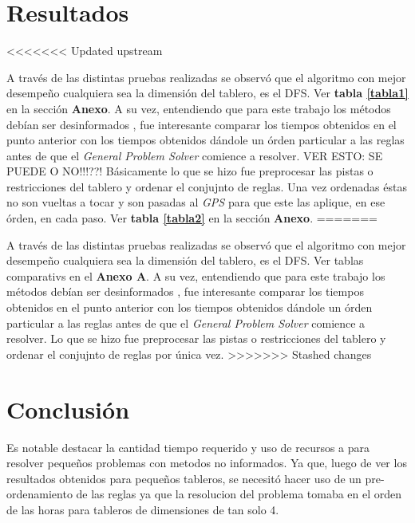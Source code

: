 \documentclass[%
	final,
	reprint,
	notitlepage,
	narroweqnarray,
	inline,
	twoside,
	invited
	]{ieee}
\begin{document}
\section{Resultados}

<<<<<<< Updated upstream
\par A través de las distintas pruebas realizadas se observó que el algoritmo con mejor desempeño cualquiera sea la dimensión del tablero, es el DFS. Ver \textbf{tabla \ref{tabla1}} en la sección \textbf{Anexo}. A su vez, entendiendo que para este trabajo los métodos debían ser desinformados , fue interesante comparar los tiempos obtenidos en el punto anterior con los tiempos obtenidos dándole un órden particular a las reglas antes de que el \textit{General Problem Solver} comience a resolver. VER ESTO: SE PUEDE O NO!!!??! Básicamente lo que se hizo fue preprocesar las pistas o restricciones del tablero y ordenar el conjujnto de reglas. Una vez ordenadas éstas no son vueltas a tocar y son pasadas al \textit{GPS} para que este las aplique, en ese órden, en cada paso. Ver \textbf{tabla \ref{tabla2}} en la sección \textbf{Anexo}.
=======
\par A través de las distintas pruebas realizadas se observó que el algoritmo con mejor desempeño cualquiera sea la dimensión del tablero, es el DFS. Ver tablas comparativs en el  \textbf{Anexo A}. A su vez, entendiendo que para este trabajo los métodos debían ser desinformados , fue interesante comparar los tiempos obtenidos en el punto anterior con los tiempos obtenidos dándole un órden particular a las reglas antes de que el \textit{General Problem Solver} comience a resolver. Lo que se hizo fue preprocesar las pistas o restricciones del tablero y ordenar el conjujnto de reglas por única vez. 
>>>>>>> Stashed changes

\section{Conclusión}

\PARstart Es notable destacar la cantidad tiempo requerido y uso de recursos a para resolver pequeños problemas con metodos no informados. Ya que, luego de ver los resultados obtenidos para pequeños tableros, se necesitó hacer uso de un pre-ordenamiento de las reglas ya que la resolucion del problema tomaba en el orden de las horas para tableros de dimensiones de tan solo 4.
\end{document}
